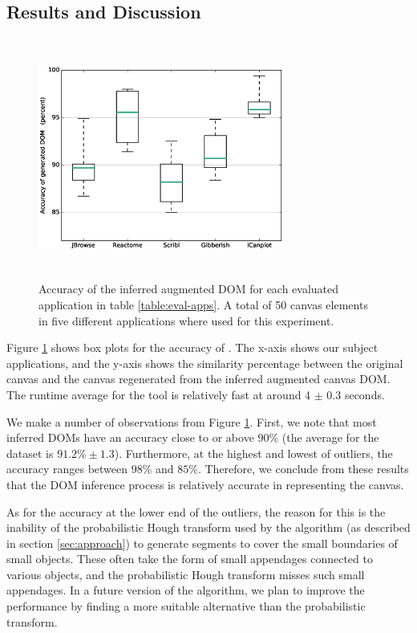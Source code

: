 
\subsection{Results and Discussion}\label{sec:discussion}

\begin{figure}[t]
    \centering
    \includegraphics[trim={0.3cm 0.3cm 0.3cm 0.3cm},clip,height=7.9cm, width=0.72\textwidth]{testability/figures/DOM-boxplot.eps}
    \caption{Accuracy of the inferred augmented DOM for each evaluated application in table \ref{table:eval-apps}. A total of 50 canvas elements in five different applications where used for this experiment.}
    \label{fig:result-DOM-accuracy}
\end{figure}

Figure \ref{fig:result-DOM-accuracy} shows box plots for the accuracy of \tool. 
The x-axis shows our subject applications, and the y-axis shows the  similarity percentage between the original canvas and the canvas regenerated from the inferred augmented canvas DOM. The runtime average for the tool is relatively fast at around 4 $\pm$ 0.3 seconds.

We make a number of observations from Figure \ref{fig:result-DOM-accuracy}. First, we note that most inferred DOMs have an accuracy close to or above $90 \%$ (the average for the dataset is $91.2 \% \pm 1.3$). Furthermore, at the highest and lowest of outliers, the accuracy ranges between $98 \%$ and $85 \%$. Therefore, we conclude from these results that the DOM inference process is relatively accurate in representing the canvas.

As for the accuracy at the lower end of the outliers, the reason for this is the inability of the probabilistic Hough transform used by the algorithm (as described in section \ref{sec:approach}) to generate segments to cover the small boundaries of small objects. These often take the form of small appendages connected to various objects, and the probabilistic Hough transform misses such small appendages. In a future version of the algorithm, we plan to improve the performance by finding a more suitable alternative than the probabilistic transform.

